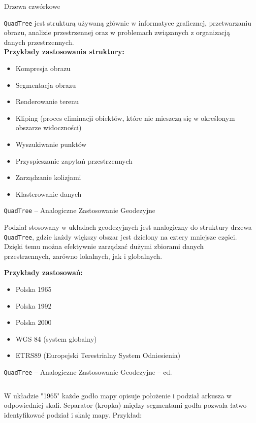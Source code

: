 \documentclass[aspectratio=1610, polish]{beamer}
\begin{document}
\begin{section}{Drzewa czwórkowe }
\begin{frame}
\texttt{QuadTree} jest strukturą używaną głównie w informatyce graficznej, przetwarzaniu obrazu,  
analizie przestrzennej oraz w problemach związanych z organizacją danych przestrzennych.
\\
\pause
\textbf{Przykłady zastosowania struktury:}
\begin{itemize}
    \item Kompresja obrazu
    \item Segmentacja obrazu
    \item Renderowanie terenu
    \item Kliping (proces eliminacji obiektów, które nie mieszczą się w określonym obszarze widoczności)
    \item Wyszukiwanie punktów
    \item Przyspieszanie zapytań przestrzennych
    \item Zarządzanie kolizjami
    \item Klasterowanie danych
\end{itemize}
\end{frame}

\begin{frame}{\texttt{QuadTree} -- Analogiczne Zastosowanie Geodezyjne}

Podział stosowany w układach geodezyjnych jest analogiczny do struktury drzewa \texttt{QuadTree}, gdzie każdy większy obszar jest dzielony na cztery mniejsze części. Dzięki temu można efektywnie zarządzać dużymi zbiorami danych przestrzennych, zarówno lokalnych, jak i globalnych.

\pause
\textbf{Przykłady zastosowań:}
\begin{itemize}
        \item Polska 1965
        \item Polska 1992
        \item Polska 2000
        \item WGS 84 (system globalny)
        \item ETRS89 (Europejski Terestrialny System Odniesienia)
\end{itemize}
\end{frame}

\begin{frame}{\texttt{QuadTree} -- Analogiczne Zastosowanie Geodezyjne -- cd.}
\begin{columns}[T] %

    \begin{column}{0.55\textwidth}
        W układzie "1965" każde godło mapy opisuje położenie i podział arkusza w odpowiedniej skali. Separator (kropka) między segmentami godła pozwala łatwo identyfikować podział i skalę mapy. Przykład:


\end{column}
\end{columns}
\end{frame}
\end{section}
\end{document}
